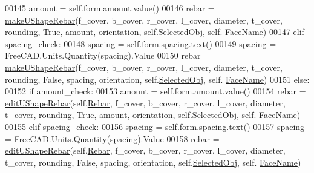 \begin{DoxyCode}
00145                 amount = self.form.amount.value()
00146                 rebar = \hyperlink{namespaceUShapeRebar_adb9f6e4b9ec41d7a1fdfe58ad174fec3}{makeUShapeRebar}(f\_cover, b\_cover, r\_cover, l\_cover, diameter, 
      t\_cover, rounding, \textcolor{keyword}{True}, amount, orientation, self.\hyperlink{classUShapeRebar_1_1__UShapeRebarTaskPanel_a74e2f5a2b08a8ae07513d6aa8ace25c6}{SelectedObj}, self.
      \hyperlink{classUShapeRebar_1_1__UShapeRebarTaskPanel_abc34324a2e2e788d505002fec92ab78f}{FaceName})
00147             \textcolor{keywordflow}{elif} spacing\_check:
00148                 spacing = self.form.spacing.text()
00149                 spacing = FreeCAD.Units.Quantity(spacing).Value
00150                 rebar = \hyperlink{namespaceUShapeRebar_adb9f6e4b9ec41d7a1fdfe58ad174fec3}{makeUShapeRebar}(f\_cover, b\_cover, r\_cover, l\_cover, diameter, 
      t\_cover, rounding, \textcolor{keyword}{False}, spacing, orientation, self.\hyperlink{classUShapeRebar_1_1__UShapeRebarTaskPanel_a74e2f5a2b08a8ae07513d6aa8ace25c6}{SelectedObj}, self.
      \hyperlink{classUShapeRebar_1_1__UShapeRebarTaskPanel_abc34324a2e2e788d505002fec92ab78f}{FaceName})
00151         \textcolor{keywordflow}{else}:
00152             \textcolor{keywordflow}{if} amount\_check:
00153                 amount = self.form.amount.value()
00154                 rebar = \hyperlink{namespaceUShapeRebar_a461f60869fd97a93fc015af4828467ee}{editUShapeRebar}(self.\hyperlink{classUShapeRebar_1_1__UShapeRebarTaskPanel_a01238597180da20c197d4c02925814f6}{Rebar}, f\_cover, b\_cover, r\_cover, l\_cover,
       diameter, t\_cover, rounding, \textcolor{keyword}{True}, amount, orientation, self.\hyperlink{classUShapeRebar_1_1__UShapeRebarTaskPanel_a74e2f5a2b08a8ae07513d6aa8ace25c6}{SelectedObj}, self.
      \hyperlink{classUShapeRebar_1_1__UShapeRebarTaskPanel_abc34324a2e2e788d505002fec92ab78f}{FaceName})
00155             \textcolor{keywordflow}{elif} spacing\_check:
00156                 spacing = self.form.spacing.text()
00157                 spacing = FreeCAD.Units.Quantity(spacing).Value
00158                 rebar = \hyperlink{namespaceUShapeRebar_a461f60869fd97a93fc015af4828467ee}{editUShapeRebar}(self.\hyperlink{classUShapeRebar_1_1__UShapeRebarTaskPanel_a01238597180da20c197d4c02925814f6}{Rebar}, f\_cover, b\_cover, r\_cover, l\_cover,
       diameter, t\_cover, rounding, \textcolor{keyword}{False}, spacing, orientation, self.\hyperlink{classUShapeRebar_1_1__UShapeRebarTaskPanel_a74e2f5a2b08a8ae07513d6aa8ace25c6}{SelectedObj}, self.
      \hyperlink{classUShapeRebar_1_1__UShapeRebarTaskPanel_abc34324a2e2e788d505002fec92ab78f}{FaceName})

\end{DoxyCode}
